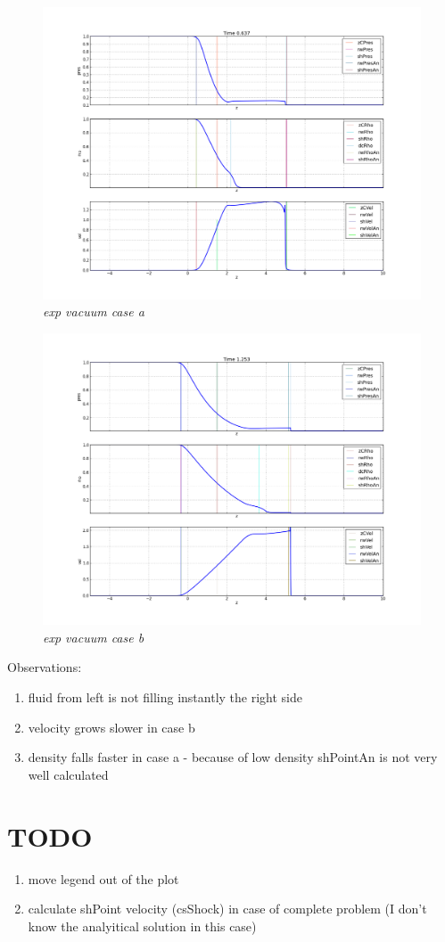 \documentclass[12pt]{book}
\begin{document}
\begin{figure}[!h]
 \centering
 \includegraphics[scale=0.4]{exp_vacuum_a.png}
	\caption{\emph{exp vacuum case a}}
 \label{Fig: 1}
\end{figure}




\begin{figure}[!h]
 \centering
 \includegraphics[scale=0.4]{exp_vacuum_b.png}
	\caption{\emph{exp vacuum case b}}
\end{figure}




Observations:
\begin{enumerate}
\item fluid from left is not filling instantly the right side
\item velocity grows slower in case b
\item density falls faster in case a 	- because of low density shPointAn is not very well calculated
\end{enumerate}

\section*{TODO}

\begin{enumerate}
\item move legend out of the plot
\item calculate shPoint velocity (csShock) in case of complete problem (I don't know the analyitical solution in this case)	
\end{enumerate}
\end{document}
